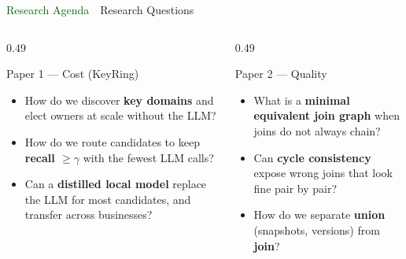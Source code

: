 \documentclass[aspectratio=169]{beamer}
\newcommand{\apptitle}[3]{\textcolor{#1}{#2}~\textcolor{black!30}{\textbar}~#3}
\begin{document}
\begin{frame}{\apptitle{darkgreen}{Research Agenda}{Research Questions}}
\footnotesize
\vspace{2mm}
\begin{columns}[T]
\begin{column}{0.49\textwidth}
\begin{block}{Paper 1 --- Cost (KeyRing)}
\vspace{1mm}
\begin{itemize}\setlength\itemsep{4pt}
  \item[\textbf{RQ1}] How do we discover \textbf{key domains} and elect owners at scale without the LLM?
  \item[\textbf{RQ2}] How do we route candidates to keep \textbf{recall $\geq\gamma$} with the fewest LLM calls?
  \item[\textbf{RQ3}] Can a \textbf{distilled local model} replace the LLM for most candidates, and transfer across businesses?
\end{itemize}
\vspace{1mm}
\end{block}
\end{column}
\begin{column}{0.49\textwidth}
\begin{block}{Paper 2 --- Quality}
\vspace{1mm}
\begin{itemize}\setlength\itemsep{4pt}
  \item[\textbf{RQ4}] What is a \textbf{minimal equivalent join graph} when joins do not always chain?
  \item[\textbf{RQ5}] Can \textbf{cycle consistency} expose wrong joins that look fine pair by pair?
  \item[\textbf{RQ6}] How do we separate \textbf{union} (snapshots, versions) from \textbf{join}?
\end{itemize}
\vspace{1mm}
\end{block}
\end{column}
\end{columns}
\end{frame}
\end{document}
